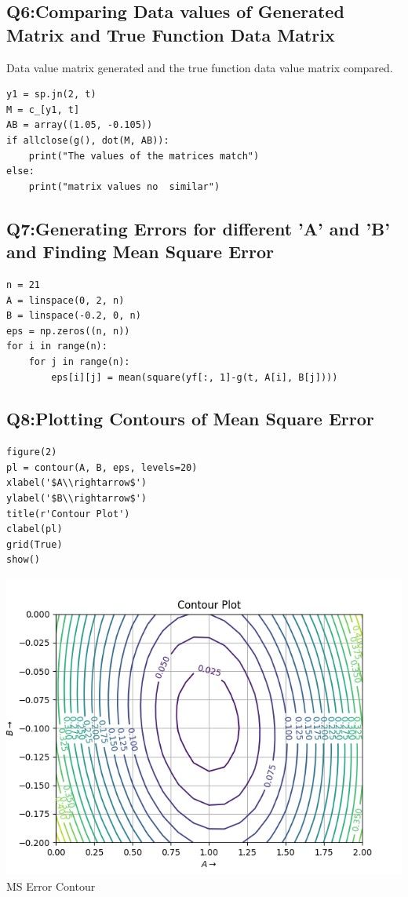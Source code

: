 \documentclass[12pt, a4paper]{report}
\begin{document}
\subsection{Q6:Comparing Data values of Generated Matrix and True Function Data Matrix}
Data value matrix generated and the true function data value matrix compared.
\begin{verbatim}
y1 = sp.jn(2, t)
M = c_[y1, t]
AB = array((1.05, -0.105))
if allclose(g(), dot(M, AB)):
    print("The values of the matrices match")
else:
    print("matrix values no  similar")
\end{verbatim}

\subsection{Q7:Generating Errors for different 'A' and 'B' and Finding Mean Square Error}
\begin{verbatim}
n = 21
A = linspace(0, 2, n)
B = linspace(-0.2, 0, n)
eps = np.zeros((n, n))
for i in range(n):
    for j in range(n):
        eps[i][j] = mean(square(yf[:, 1]-g(t, A[i], B[j])))
\end{verbatim}

\subsection{Q8:Plotting Contours of Mean Square Error}
\begin{verbatim}
figure(2)
pl = contour(A, B, eps, levels=20)
xlabel('$A\\rightarrow$')
ylabel('$B\\rightarrow$')
title(r'Contour Plot')
clabel(pl)
grid(True)
show()
\end{verbatim}
	\centering
	\includegraphics[scale=0.65]{Figure_2.png}  \\ 
	\caption{MS Error Contour}
\end{document}
